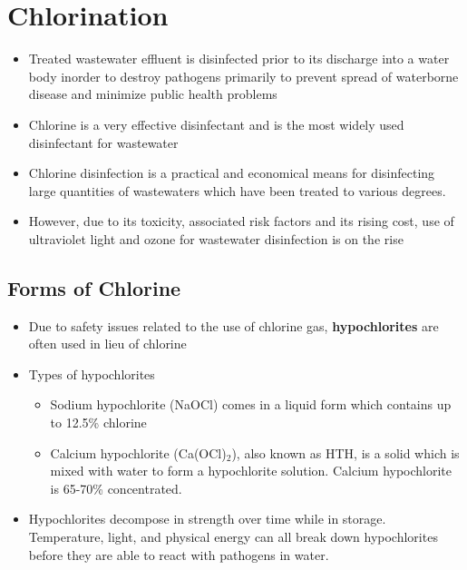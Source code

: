 



\chapter{Chlorination}


\begin{itemize}
\item Treated wastewater effluent is disinfected prior to its discharge into a water body inorder to destroy pathogens primarily to prevent spread of waterborne disease and minimize public health problems
\item Chlorine is a very effective disinfectant and is the most widely used disinfectant for wastewater 
\item Chlorine disinfection is a practical and economical means for disinfecting large quantities of wastewaters which have been treated to various degrees. 
\item However, due to its toxicity, associated risk factors and its rising cost, use of ultraviolet light and ozone for wastewater disinfection is on the rise
\end{itemize}


\section{Forms of Chlorine}

\begin{itemize}
	\item Due to safety issues related to the use of chlorine gas, 			\textbf{hypochlorites} are often used in lieu of chlorine
	\item Types of hypochlorites
	\begin{itemize}
	\item Sodium hypochlorite (NaOCl) comes in a liquid form which contains up to 12.5\% chlorine
	\item Calcium hypochlorite (Ca(OCl)$_2$), also known as HTH, is a solid which is mixed with water to form a hypochlorite solution. Calcium hypochlorite is 65-70\% concentrated.
	\end{itemize}
	\item Hypochlorites decompose in strength over time while in storage. Temperature, light, and physical energy can all break down hypochlorites before they are able to react with pathogens in water. 

\end{itemize} 

